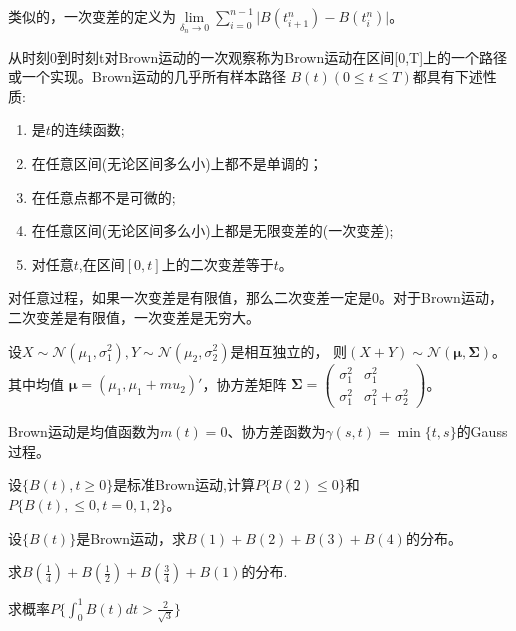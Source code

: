 类似的，一次变差的定义为\(\underset{\delta_n \to 0}{\lim}\sum_{i=0}^{n-1}\lvert B(t_{i+1}^n)-B(t_i^n) \rvert\)。

从时刻0到时刻t对Brown运动的一次观察称为Brown运动在区间[0,T]上的一个路径或一个实现。Brown运动的几乎所有样本路径
\(B(t)(0\leqslant t\leqslant T)\)都具有下述性质:
\begin{enumerate}[\bfseries (1)]
	\item 是\(t\)的连续函数;
	\item 在任意区间(无论区间多么小)上都不是单调的；
	\item 在任意点都不是可微的;
	\item 在任意区间(无论区间多么小)上都是无限变差的(一次变差);
	\item 对任意\(t\),在区间\([0,t]\)上的二次变差等于\(t\)。
\end{enumerate}

对任意过程，如果一次变差是有限值，那么二次变差一定是0。对于Brown运动，二次变差是有限值，一次变差是无穷大。

\begin{theorem}[多元正态分布的性质]\label{prop:MultiNormDist}
	设\(X\sim \mathcal{N}(\mu_1,\sigma^2_1),Y\sim \mathcal{N}(\mu_2,\sigma_2^2)\)是相互独立的，
	则\((X+Y)\sim \mathcal{N}(\boldsymbol{\mu},\boldsymbol{\Sigma})\)。其中均值
	\(\boldsymbol{\mu }=(\mu_1,\mu_1+mu_2)'\)，协方差矩阵
	\(\boldsymbol{\Sigma}=\begin{pmatrix}
		\sigma_1^2 & \sigma_1^2            \\
		\sigma_1^2 & \sigma_1^2+\sigma_2^2
	\end{pmatrix}\)。
\end{theorem}

\begin{theorem}[Brown运动是Gauss过程]\label{prop:GaussProcess}
	Brown运动是均值函数为\(m(t)=0\)、协方差函数为\(\gamma (s,t)=\min\{t,s\}\)的Gauss过程。
\end{theorem}

\newpage
\begin{Exercises}
	\item 设\(\{B(t),t\geqslant0\}\)是标准Brown运动,计算\(P\{B(2)\leqslant0\}\)和\(P\{B(t),\leqslant0,t=0,1,2\}\)。
	\vspace{30em}
	\item 设\(\{B(t)\}\)是Brown运动，求\(B(1)+B(2)+B(3)+B(4)\)的分布。
	\newpage
	\item 求\(B(\frac{1}{4})+B(\frac{1}{2})+B(\frac{3}{4})+B(1)\)的分布.
	\vspace{30em}
	\item 求概率\(P\{\int_{0}^{1} B(t)dt>\frac{2}{\sqrt{3}}\}\)
\end{Exercises}